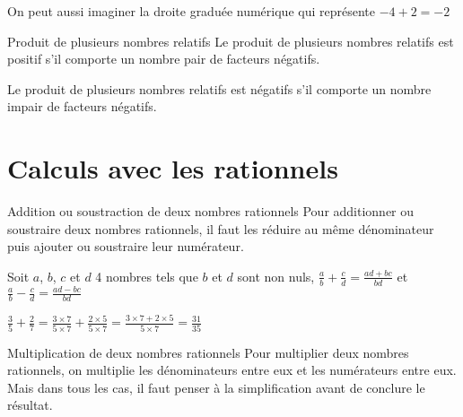 \begin{pageCours}
\begin{minipage}{0.5\linewidth}
\begin{Rq}
 
On peut aussi imaginer la droite graduée numérique qui représente $-4+2=-2$
 


\end{Rq}


\begin{ThT}{Produit de plusieurs nombres relatifs}
Le produit de plusieurs nombres relatifs est positif s'il comporte un nombre pair de facteurs négatifs.

Le produit de plusieurs nombres relatifs est négatifs s'il comporte un nombre impair de facteurs négatifs.
\end{ThT}
\end{minipage}

\section{Calculs avec les rationnels}

\begin{minipage}[t]{0.5\linewidth}
\begin{DefT}{Addition ou soustraction de deux nombres rationnels}
Pour additionner ou soustraire deux nombres rationnels, il faut les réduire au même dénominateur puis ajouter ou soustraire leur numérateur.


Soit $a$, $b$, $c$ et $d$ 4 nombres tels que $b$ et $d$ sont non nuls, $\frac{a}{b}+\frac{c}{d} = \frac{ad+bc}{bd}$ et $\frac{a}{b}-\frac{c}{d} = \frac{ad-bc}{bd}$
\end{DefT}

\begin{Ex}
 $\frac{3}{5}+\frac{2}{7} = \frac{3 \times 7 }{5 \times 7} + \frac{2 \times 5 }{5 \times 7} = \frac{3 \times 7+2 \times 5 }{5 \times 7} = \frac{31 }{35}$ 
\end{Ex}
\end{minipage}
\begin{minipage}[t]{0.5\linewidth}
\begin{DefT}{Multiplication de deux nombres rationnels}
Pour multiplier deux nombres rationnels, on multiplie les dénominateurs entre eux et les numérateurs entre eux. Mais dans tous les cas, il faut penser à la simplification avant de conclure le résultat.


\end{DefT}
\end{minipage}
\end{pageCours}
